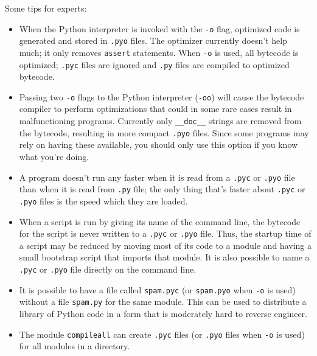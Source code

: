 \documentclass[UTF8]{article}
\begin{document}
Some tips for experts:
\begin{itemize}
    \item When the Python interpreter is invoked with the \texttt{-o} flag, optimized code is
    generated and stored in \texttt{.pyo} files. The optimizer currently doesn't help much; it only
    removes \texttt{assert} statements. When \texttt{-o} is used, all bytecode is optimized;
    \texttt{.pyc} files are ignored and \texttt{.py} files are compiled to optimized bytecode.
    \item Passing two \texttt{-o} flags to the Python interpreter (\texttt{-oo}) will cause the
    bytecode compiler to perform optimizations that could in some rare cases result in
    malfunctioning programs. Currently only \texttt{\_\_doc\_\_} strings are removed from the
    bytecode, resulting in more compact \texttt{.pyo} files. Since some programs may rely on having
    these available, you should only use this option if you know what you're doing.
    \item A program doesn't run any faster when it is read from a \texttt{.pyc} or \texttt{.pyo}
    file than when it is read from \texttt{.py} file; the only thing that's faster about
    \texttt{.pyc} or \texttt{.pyo} files is the speed which they are loaded.
    \item When a script is run by giving its name of the command line, the bytecode for the script
    is never written to a \texttt{.pyc} or \texttt{.pyo} file. Thus, the startup time of a script
    may be reduced by moving most of its code to a module and having a small bootstrap script that
    imports that module. It is also possible to name a \texttt{.pyc} or \texttt{.pyo} file directly
    on the command line.
    \item It is possible to have a file called \texttt{spam.pyc} (or \texttt{spam.pyo} when
    \texttt{-o} is used) without a file \texttt{spam.py} for the same module. This can be used to
    distribute a library of Python code in a form that is moderately hard to reverse engineer.
    \item The module \texttt{compileall} can create \texttt{.pyc} files (or \texttt{.pyo} files
    when \texttt{-o} is used) for all modules in a directory.
\end{itemize}
\end{document}
